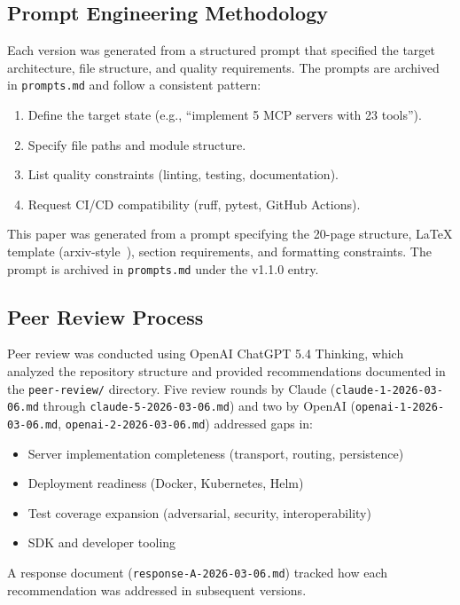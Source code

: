 \documentclass{article}
\begin{document}
\subsection{Prompt Engineering Methodology}

Each version was generated from a structured prompt that specified the target architecture, file structure, and quality requirements. The prompts are archived in \texttt{prompts.md} and follow a consistent pattern:

\begin{enumerate}[leftmargin=*]
\item Define the target state (e.g., ``implement 5 MCP servers with 23 tools'').
\item Specify file paths and module structure.
\item List quality constraints (linting, testing, documentation).
\item Request CI/CD compatibility (ruff, pytest, GitHub Actions).
\end{enumerate}

This paper was generated from a prompt specifying the 20-page structure, LaTeX template (arxiv-style~\cite{arxivstyle}), section requirements, and formatting constraints. The prompt is archived in \texttt{prompts.md} under the v1.1.0 entry.

\subsection{Peer Review Process}

Peer review was conducted using OpenAI ChatGPT 5.4 Thinking, which analyzed the repository structure and provided recommendations documented in the \texttt{peer-review/} directory. Five review rounds by Claude (\texttt{claude-1-2026-03-06.md} through \texttt{claude-5-2026-03-06.md}) and two by OpenAI (\texttt{openai-1-2026-03-06.md}, \texttt{openai-2-2026-03-06.md}) addressed gaps in:

\begin{itemize}[leftmargin=*]
\item Server implementation completeness (transport, routing, persistence)
\item Deployment readiness (Docker, Kubernetes, Helm)
\item Test coverage expansion (adversarial, security, interoperability)
\item SDK and developer tooling
\end{itemize}

A response document (\texttt{response-A-2026-03-06.md}) tracked how each recommendation was addressed in subsequent versions.
\end{document}
